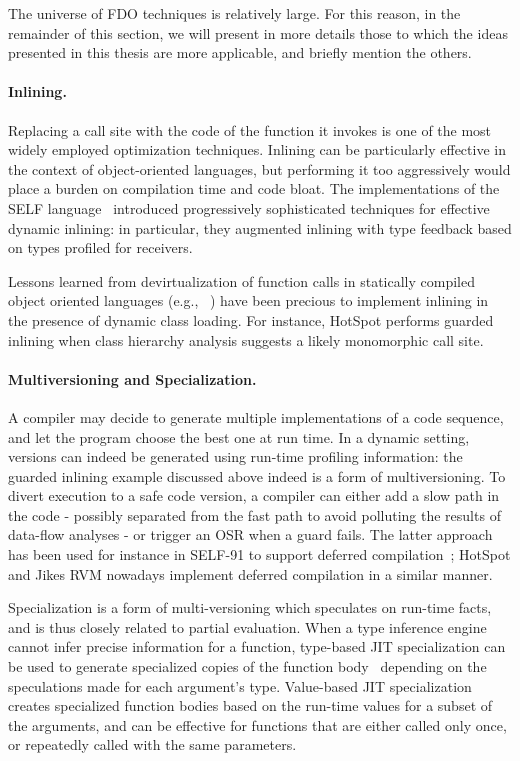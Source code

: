 The universe of FDO techniques is relatively large. For this reason, in the remainder of this section, we will present in more details those to which the ideas presented in this thesis are more applicable, and briefly mention the others.

\paragraph*{Inlining.} Replacing a call site with the code of the function it invokes is one of the most widely employed optimization techniques. Inlining can be particularly effective in the context of object-oriented languages, but performing it too aggressively would place a burden on compilation time and code bloat. The implementations of the SELF language~\cite{Holzle92,Holzle96} introduced progressively sophisticated techniques for effective dynamic inlining: in particular, they augmented inlining with type feedback based on types profiled for receivers.

Lessons learned from devirtualization of function calls in statically compiled object oriented languages (e.g., ~\cite{Bacon96,Dean96}) have been precious to implement inlining in the presence of dynamic class loading. For instance, HotSpot performs guarded inlining when class hierarchy analysis suggests a likely monomorphic call site.

\paragraph*{Multiversioning and Specialization.} A compiler may decide to generate multiple implementations of a code sequence, and let the program choose the best one at run time. In a dynamic setting, versions can indeed be generated using run-time profiling information: the guarded inlining example discussed above indeed is a form of multiversioning. To divert execution to a safe code version, a compiler can either add a slow path in the code - possibly separated from the fast path to avoid polluting the results of data-flow analyses - or trigger an OSR when a guard fails. The latter approach has been used for instance in SELF-91 to support deferred compilation~\cite{Chambers91}; HotSpot and Jikes RVM nowadays implement deferred compilation in a similar manner.

Specialization is a form of multi-versioning which speculates on run-time facts, and is thus closely related to partial evaluation. When a type inference engine cannot infer precise information for a function, type-based JIT specialization can be used to generate specialized copies of the function body~\cite{Cooper92} depending on the speculations made for each argument's type. Value-based JIT specialization~\cite{Santos13} creates specialized function bodies based on the run-time values for a subset of the arguments, and can be effective for functions that are either called only once, or repeatedly called with the same parameters.

